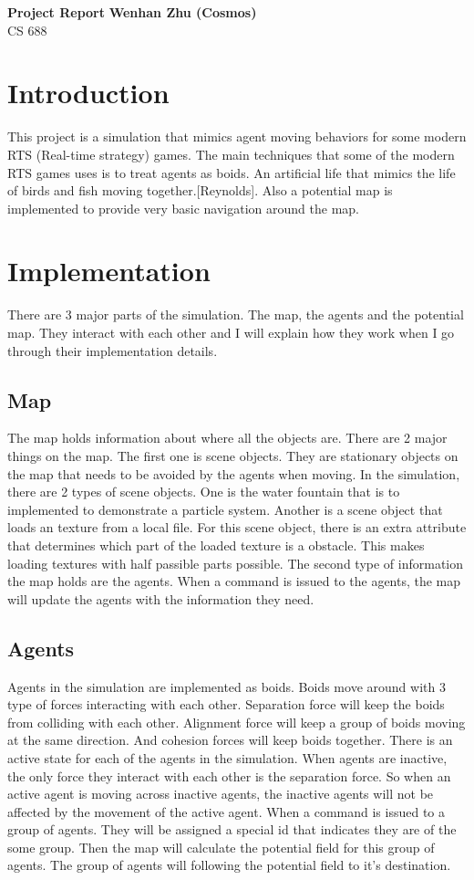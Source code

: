 \documentclass[letterpaper, 12pt]{article}
\begin{document}
\noindent
\large\textbf{Project Report} \hfill \textbf{Wenhan Zhu (Cosmos)} \\
\normalsize CS 688

\section*{Introduction}
This project is a simulation that mimics agent moving behaviors for some modern RTS (Real-time strategy) games. The main techniques that some of the modern RTS games uses is to treat agents as boids. An artificial life that mimics the life of birds and fish moving together.[Reynolds]. Also a potential map is implemented to provide very basic navigation around the map. 

\section*{Implementation}
There are 3 major parts of the simulation. The map, the agents and the potential map. They interact with each other and I will explain how they work when I go through their implementation details. 

\subsection*{Map}
The map holds information about where all the objects are. There are 2 major things on the map. The first one is scene objects. They are stationary objects on the map that needs to be avoided by the agents when moving. In the simulation, there are 2 types of scene objects. One is the water fountain that is to implemented to demonstrate a particle system. Another is a scene object that loads an texture from a local file. For this scene object, there is an extra attribute that determines which part of the loaded texture is a obstacle. This makes loading textures with half passible parts possible. The second type of information the map holds are the agents. When a command is issued to the agents, the map will update the agents with the information they need.


\subsection*{Agents}
Agents in the simulation are implemented as boids. Boids move around with 3 type of forces interacting with each other. Separation force will keep the boids from colliding with each other. Alignment force will keep a group of boids moving at the same direction. And cohesion forces will keep boids together. There is an active state for each of the agents in the simulation. When agents are inactive, the only force they interact with each other is the separation force. So when an active agent is moving across inactive agents, the inactive agents will not be affected by the movement of the active agent. When a command is issued to a group of agents. They will be assigned a special id that indicates they are of the some group. Then the map will calculate the potential field for this group of agents. The group of agents will following the potential field to it's destination. 
\end{document}
